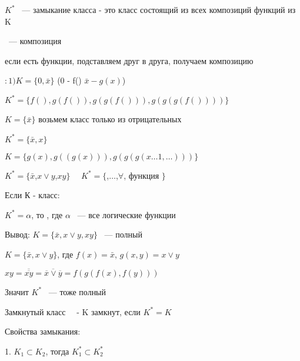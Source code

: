 \documentclass[russian]{lecture-notes}
\begin{document}
    $K^{*}$ ~--- замыкание класса - это класс состоящий из всех композиций функций из K


     ~--- композиция

    если есть функции, подставляем друг в друга, получаем композицию

    \begin{example}
        $:1) K = \{0,\bar{x}\}$ \quad (0 - f() $\bar{x} - g(x)$)

        $K^{*} = \{ f(), g(f()), g(g(f())), g(g(g(f())))\}$
    \end{example}
    \begin{example}
        $K = \{\bar{x}\}$ возьмем класс только из отрицательных

        $K^{*} = \{ \bar{x}, x\}$

        $K = \{ g(x), g((g(x))), g(g(g(x \dots 1, \dots )))\}$
    \end{example}
    \begin{example}
        $K^{*}=\{ \bar{x}$,$ x \lor y$,$ xy \}$  $\quad K^{*} = \{ $,$ \dots$,$ \forall$, функция $\}$
    \end{example}

    \begin{definition}

        Если К - класс:

        $K^{*} = \alpha$, то , где $\alpha$ ~--- все логические функции

        Вывод: $K = \{ \bar{x}, x \lor y, xy\}$ ~--- полный

    \end{definition}
    \begin{example}

        $K = \{\bar{x}, x \lor y \}$, где $f(x) = \bar{x}$, $g(x, y) = x \lor y$
    \end{example}

    $xy = \overline{\overline{xy}} = \overline{\overline{x} \lor \overline{y}}
    = f(g(f(x),f(y)))$  %

    Значит $K^{*}$ ~--- тоже полный


    \begin{definition}
        Замкнутый класс ~~- K замкнут, если $K^{*} = K$
    \end{definition}

    Свойства замыкания:

    1. $K_{1} \subset K_{2}$, тогда $K_{1}^{*} \subset K_{2}^{*}$
\end{document}
